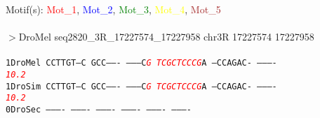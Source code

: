 \documentclass[11pt,twoside,reqno,a4paper]{article}
\begin{document}
\noindent
\newlength{\charwidth}Motif(s): \textcolor{Red}{Mot\_1}, \textcolor{Blue}{Mot\_2}, \textcolor{Green}{Mot\_3}, \textcolor{Yellow}{Mot\_4}, \textcolor{Brown}{Mot\_5}\\
\\
$>$DroMel	seq2820\_3R\_17227574\_17227958	chr3R	17227574	17227958 \\
 \\
\texttt{1\hspace*{3\charwidth}DroMel	CCTTGT---C	GCC-------	--------C\textit{\textcolor{Red}{G}}	\textit{\textcolor{Red}{T}}\textit{\textcolor{Red}{C}}\textit{\textcolor{Red}{G}}\textit{\textcolor{Red}{C}}\textit{\textcolor{Red}{T}}\textit{\textcolor{Red}{C}}\textit{\textcolor{Red}{C}}\textit{\textcolor{Red}{C}}\textit{\textcolor{Red}{G}}A	---CCAGAC-	----------	\\
\hspace*{4\charwidth}\hspace*{7\charwidth}\hspace*{1\charwidth}\hspace*{1\charwidth}\hspace*{29\charwidth}\textit{\textcolor{Red}{10.2}}\hspace*{1\charwidth}\hspace*{1\charwidth}\hspace*{1\charwidth}\hspace*{1\charwidth}\\
1\hspace*{3\charwidth}DroSim	CCTTGT---C	GCC-------	--------C\textit{\textcolor{Red}{G}}	\textit{\textcolor{Red}{T}}\textit{\textcolor{Red}{C}}\textit{\textcolor{Red}{G}}\textit{\textcolor{Red}{C}}\textit{\textcolor{Red}{T}}\textit{\textcolor{Red}{C}}\textit{\textcolor{Red}{C}}\textit{\textcolor{Red}{C}}\textit{\textcolor{Red}{G}}A	---CCAGAC-	----------	\\
\hspace*{4\charwidth}\hspace*{7\charwidth}\hspace*{1\charwidth}\hspace*{1\charwidth}\hspace*{29\charwidth}\textit{\textcolor{Red}{10.2}}\hspace*{1\charwidth}\hspace*{1\charwidth}\hspace*{1\charwidth}\hspace*{1\charwidth}\\
0\hspace*{3\charwidth}DroSec	----------	----------	----------	----------	----------	----------	\\
}
\end{document}
